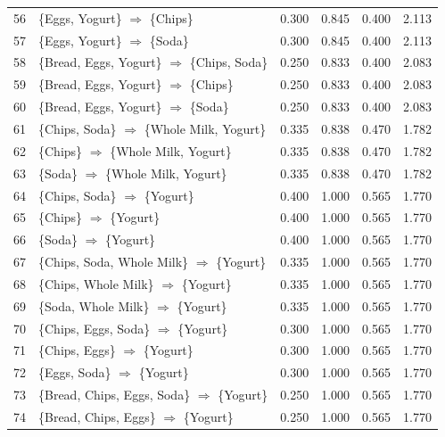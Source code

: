 \documentclass[12pt,letterpaper, onecolumn]{exam}
\begin{document}
\begin{questions}
\begin{solution}
{\begin{longtable}{|c|l|c|c|c|c|}
            56 & \{Eggs, Yogurt\} $\Rightarrow$ \{Chips\} & 0.300 & 0.845 & 0.400 & 2.113 \\
            57 & \{Eggs, Yogurt\} $\Rightarrow$ \{Soda\} & 0.300 & 0.845 & 0.400 & 2.113 \\
            58 & \{Bread, Eggs, Yogurt\} $\Rightarrow$ \{Chips, Soda\} & 0.250 & 0.833 & 0.400 & 2.083 \\
            59 & \{Bread, Eggs, Yogurt\} $\Rightarrow$ \{Chips\} & 0.250 & 0.833 & 0.400 & 2.083 \\
            60 & \{Bread, Eggs, Yogurt\} $\Rightarrow$ \{Soda\} & 0.250 & 0.833 & 0.400 & 2.083 \\
            61 & \{Chips, Soda\} $\Rightarrow$ \{Whole Milk, Yogurt\} & 0.335 & 0.838 & 0.470 & 1.782 \\
            62 & \{Chips\} $\Rightarrow$ \{Whole Milk, Yogurt\} & 0.335 & 0.838 & 0.470 & 1.782 \\
            63 & \{Soda\} $\Rightarrow$ \{Whole Milk, Yogurt\} & 0.335 & 0.838 & 0.470 & 1.782 \\
            64 & \{Chips, Soda\} $\Rightarrow$ \{Yogurt\} & 0.400 & 1.000 & 0.565 & 1.770 \\
            65 & \{Chips\} $\Rightarrow$ \{Yogurt\} & 0.400 & 1.000 & 0.565 & 1.770 \\
            66 & \{Soda\} $\Rightarrow$ \{Yogurt\} & 0.400 & 1.000 & 0.565 & 1.770 \\
            67 & \{Chips, Soda, Whole Milk\} $\Rightarrow$ \{Yogurt\} & 0.335 & 1.000 & 0.565 & 1.770 \\
            68 & \{Chips, Whole Milk\} $\Rightarrow$ \{Yogurt\} & 0.335 & 1.000 & 0.565 & 1.770 \\
            69 & \{Soda, Whole Milk\} $\Rightarrow$ \{Yogurt\} & 0.335 & 1.000 & 0.565 & 1.770 \\
            70 & \{Chips, Eggs, Soda\} $\Rightarrow$ \{Yogurt\} & 0.300 & 1.000 & 0.565 & 1.770 \\
            71 & \{Chips, Eggs\} $\Rightarrow$ \{Yogurt\} & 0.300 & 1.000 & 0.565 & 1.770 \\
            72 & \{Eggs, Soda\} $\Rightarrow$ \{Yogurt\} & 0.300 & 1.000 & 0.565 & 1.770 \\
            73 & \{Bread, Chips, Eggs, Soda\} $\Rightarrow$ \{Yogurt\} & 0.250 & 1.000 & 0.565 & 1.770 \\
            74 & \{Bread, Chips, Eggs\} $\Rightarrow$ \{Yogurt\} & 0.250 & 1.000 & 0.565 & 1.770 \\

\end{longtable}}
\end{solution}
\end{questions}
\end{document}
